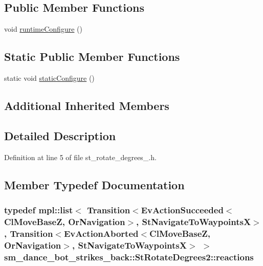 \subsection*{Public Member Functions}
\begin{DoxyCompactItemize}
\item 
void \hyperlink{structsm__dance__bot__strikes__back_1_1StRotateDegrees2_a5deec1794efd564280833dd687c5a436}{runtime\+Configure} ()
\end{DoxyCompactItemize}
\subsection*{Static Public Member Functions}
\begin{DoxyCompactItemize}
\item 
static void \hyperlink{structsm__dance__bot__strikes__back_1_1StRotateDegrees2_af1e939b6d83665b725ecba04323333d6}{static\+Configure} ()
\end{DoxyCompactItemize}
\subsection*{Additional Inherited Members}


\subsection{Detailed Description}


Definition at line 5 of file st\+\_\+rotate\+\_\+degrees\+\_.\+h.



\subsection{Member Typedef Documentation}
\subsubsection[{\texorpdfstring{reactions}{reactions}}]{\setlength{\rightskip}{0pt plus 5cm}typedef mpl\+::list$<$ Transition$<$Ev\+Action\+Succeeded$<${\bf Cl\+Move\+BaseZ}, {\bf Or\+Navigation}$>$, {\bf St\+Navigate\+To\+WaypointsX}$>$, Transition$<$Ev\+Action\+Aborted$<${\bf Cl\+Move\+BaseZ}, {\bf Or\+Navigation}$>$, {\bf St\+Navigate\+To\+WaypointsX}$>$ $>$ {\bf sm\+\_\+dance\+\_\+bot\+\_\+strikes\+\_\+back\+::\+St\+Rotate\+Degrees2\+::reactions}}\hypertarget{structsm__dance__bot__strikes__back_1_1StRotateDegrees2_a15ea014ebb51ef518b9d757812973351}{}\label{structsm__dance__bot__strikes__back_1_1StRotateDegrees2_a15ea014ebb51ef518b9d757812973351}


